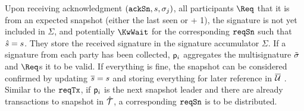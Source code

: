 \quad Upon receiving acknowledgment $(\mathtt{ackSn},s,\sigma_j)$,
all participants $\Req$ that it is from an expected snapshot (either the last
seen or + 1), the signature is not yet included in $\Sigma$, and potentially
$\KwWait$ for the corresponding $\mathtt{reqSn}$ such that $\hat s = s$. They store the
received signature in the signature accumulator $\Sigma$. If a signature from
each party has been collected, $\mathsf p_i$ aggregates the multisignature
$\tilde \sigma$ and $\Req$s it to be valid.  If
everything is fine, the snapshot can be considered confirmed by updating
$\overline s=s$ and storing everything for later reference in $\overline {\mathcal U}$ . Similar to the $\mathtt{reqTx}$, if $\mathsf p_i$ is the next snapshot leader and there are already transactions to snapshot in $\hat {\mathcal T}$, a corresponding $\mathtt{reqSn}$ is to be distributed.



